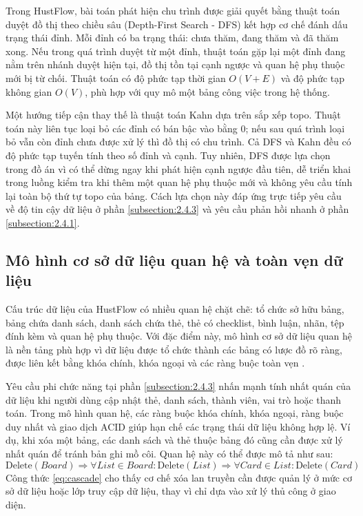 \documentclass[../DoAn.tex]{subfiles}
\begin{document}
Trong HustFlow, bài toán phát hiện chu trình được giải quyết bằng thuật toán duyệt đồ thị theo chiều sâu (Depth-First Search - DFS) kết hợp cơ chế đánh dấu trạng thái đỉnh. Mỗi đỉnh có ba trạng thái: chưa thăm, đang thăm và đã thăm xong. Nếu trong quá trình duyệt từ một đỉnh, thuật toán gặp lại một đỉnh đang nằm trên nhánh duyệt hiện tại, đồ thị tồn tại cạnh ngược và quan hệ phụ thuộc mới bị từ chối. Thuật toán có độ phức tạp thời gian $O(V + E)$ và độ phức tạp không gian $O(V)$, phù hợp với quy mô một bảng công việc trong hệ thống.

Một hướng tiếp cận thay thế là thuật toán Kahn dựa trên sắp xếp topo. Thuật toán này liên tục loại bỏ các đỉnh có bán bậc vào bằng 0; nếu sau quá trình loại bỏ vẫn còn đỉnh chưa được xử lý thì đồ thị có chu trình. Cả DFS và Kahn đều có độ phức tạp tuyến tính theo số đỉnh và cạnh. Tuy nhiên, DFS được lựa chọn trong đồ án vì có thể dừng ngay khi phát hiện cạnh ngược đầu tiên, dễ triển khai trong luồng kiểm tra khi thêm một quan hệ phụ thuộc mới và không yêu cầu tính lại toàn bộ thứ tự topo của bảng. Cách lựa chọn này đáp ứng trực tiếp yêu cầu về độ tin cậy dữ liệu ở phần \ref{subsection:2.4.3} và yêu cầu phản hồi nhanh ở phần \ref{subsection:2.4.1}.

\subsection{Mô hình cơ sở dữ liệu quan hệ và toàn vẹn dữ liệu}
\label{subsection:3.1.2}

Cấu trúc dữ liệu của HustFlow có nhiều quan hệ chặt chẽ: tổ chức sở hữu bảng, bảng chứa danh sách, danh sách chứa thẻ, thẻ có checklist, bình luận, nhãn, tệp đính kèm và quan hệ phụ thuộc. Với đặc điểm này, mô hình cơ sở dữ liệu quan hệ là nền tảng phù hợp vì dữ liệu được tổ chức thành các bảng có lược đồ rõ ràng, được liên kết bằng khóa chính, khóa ngoại và các ràng buộc toàn vẹn \cite{codd1970relational}.

Yêu cầu phi chức năng tại phần \ref{subsection:2.4.3} nhấn mạnh tính nhất quán của dữ liệu khi người dùng cập nhật thẻ, danh sách, thành viên, vai trò hoặc thanh toán. Trong mô hình quan hệ, các ràng buộc khóa chính, khóa ngoại, ràng buộc duy nhất và giao dịch ACID giúp hạn chế các trạng thái dữ liệu không hợp lệ. Ví dụ, khi xóa một bảng, các danh sách và thẻ thuộc bảng đó cũng cần được xử lý nhất quán để tránh bản ghi mồ côi. Quan hệ này có thể được mô tả như sau:
\begin{equation}\label{eq:cascade}
    \text{Delete}(Board) \Longrightarrow \forall List \in Board: \text{Delete}(List) \Longrightarrow \forall Card \in List: \text{Delete}(Card)
\end{equation}
Công thức \eqref{eq:cascade} cho thấy cơ chế xóa lan truyền cần được quản lý ở mức cơ sở dữ liệu hoặc lớp truy cập dữ liệu, thay vì chỉ dựa vào xử lý thủ công ở giao diện.
\end{document}
